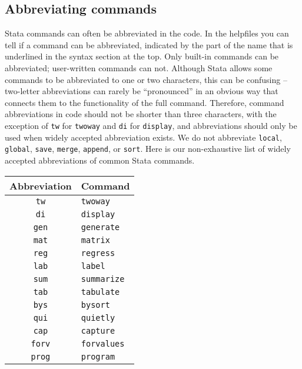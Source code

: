 
\subsection{Abbreviating commands}

Stata commands can often be abbreviated in the code. In the helpfiles you can tell if a command can be
abbreviated, indicated by the part of the name that is underlined in the syntax section at the top.
Only built-in commands can be abbreviated; user-written commands can not.
Although Stata allows some commands to be abbreviated to one or two characters,
this can be confusing -- two-letter abbreviations can rarely be ``pronounced''
in an obvious way that connects them to the functionality of the full command.
Therefore, command abbreviations in code should not be shorter than three characters,
with the exception of \texttt{tw} for \texttt{twoway} and \texttt{di} for \texttt{display},
and abbreviations should only be used when widely accepted abbreviation exists.
We do not abbreviate \texttt{local}, \texttt{global}, \texttt{save}, \texttt{merge}, \texttt{append}, or \texttt{sort}.
Here is our non-exhaustive list of widely accepted abbreviations of common Stata commands.

\begin{center}
	\begin{tabular}{ c | l }
    Abbreviation & Command \\
		\hline
		\texttt{tw} & \texttt{twoway} \\
		\texttt{di} & \texttt{display} \\
		\texttt{gen} & \texttt{generate} \\
		\texttt{mat} & \texttt{matrix} \\
		\texttt{reg} & \texttt{regress} \\
		\texttt{lab} & \texttt{label} \\
		\texttt{sum} & \texttt{summarize} \\
		\texttt{tab} & \texttt{tabulate} \\
		\texttt{bys} & \texttt{bysort} \\
		\texttt{qui} & \texttt{quietly} \\
		\texttt{cap} & \texttt{capture} \\
		\texttt{forv} & \texttt{forvalues} \\
		\texttt{prog} & \texttt{program} \\
		\hline
	\end{tabular}
\end{center}

